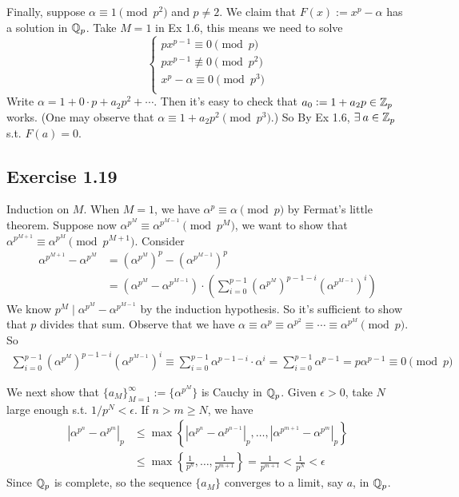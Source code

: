 \documentclass[../Koblitz.tex]{subfiles}
\begin{document}
Finally, suppose $\alpha\equiv1\pmod{p^2}$ and $p\neq2$. We claim that $F(x):=x^p-\alpha$ has a solution in $\mathbb{Q}_p$. Take $M=1$ in Ex 1.6, this means we need to solve
$$
\begin{cases*}
px^{p-1} \equiv0\pmod{p} \\
px^{p-1} \not\equiv0\pmod{p^2} \\
x^p-\alpha \equiv0 \pmod{p^3} \\
\end{cases*}
$$
Write $\alpha=1+0\cdot p+a_2p^2+\cdots$. Then it's easy to check that $a_0:=1+a_2p\in\mathbb{Z}_p$ works. (One may observe that $\alpha\equiv 1+a_2p^2\pmod{p^3}$.) So By Ex 1.6, $\exists a\in\ZZ_p$ s.t. $F(a)=0$.

\subsection*{Exercise 1.19}

Induction on $M$. When $M=1$, we have $\alpha^p\equiv\alpha\pmod{p}$ by Fermat's little theorem. Suppose now $\alpha^{p^M}\equiv\alpha^{p^{M-1}} \pmod{p^M}$, we want to show that $\alpha^{p^{M+1}}\equiv\alpha^{p^M} \pmod{p^{M+1}}$. Consider
\begin{align*}
\alpha^{p^{M+1}}-\alpha^{p^M} &= \left(\alpha^{p^M}\right)^p - \left(\alpha^{p^{M-1}}\right)^p \\
&= \left(\alpha^{p^M}-\alpha^{p^{M-1}}\right)\cdot \left(\sum_{i=0}^{p-1} \left(\alpha^{p^M}\right)^{p-1-i}\left(\alpha^{p^{M-1}}\right)^i\right)
\end{align*}
We know $p^M\mid\alpha^{p^M}-\alpha^{p^{M-1}}$ by the induction hypothesis. So it's sufficient to show that $p$ divides that sum. Observe that we have $\alpha\equiv\alpha^p\equiv\alpha^{p^2}\equiv\cdots\equiv\alpha^{p^M} \pmod{p}$. So
\begin{align*}
\sum_{i=0}^{p-1} \left(\alpha^{p^M}\right)^{p-1-i}\left(\alpha^{p^{M-1}}\right)^i \equiv \sum_{i=0}^{p-1} \alpha^{p-1-i}\cdot\alpha^i = \sum_{i=0}^{p-1} \alpha^{p-1} = p\alpha^{p-1} \equiv 0 \pmod{p}
\end{align*}

We next show that $\{a_M\}_{M=1}^\infty:=\{\alpha^{p^M}\}$ is Cauchy in $\mathbb{Q}_p$. Given $\epsilon>0$, take $N$ large enough s.t. $1/p^N<\epsilon$. If $n>m\geq N$, we have
\begin{align*}
\left|\alpha^{p^n}-\alpha^{p^m}\right|_p &\leq \max\left\{ \left|\alpha^{p^n}-\alpha^{p^{n-1}}\right|_p,\ldots,\left|\alpha^{p^{m+1}}-\alpha^{p^m}\right|_p \right\} \\
&\leq \max \left\{ \frac{1}{p^n},\ldots,\frac{1}{p^{m+1}} \right\} = \frac{1}{p^{m+1}} < \frac{1}{p^N} <\epsilon
\end{align*}
Since $\mathbb{Q}_p$ is complete, so the sequence $\{a_M\}$ converges to a limit, say $a$, in $\mathbb{Q}_p$.
\end{document}
